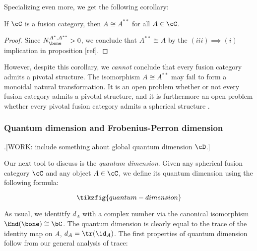 Specializing even more, we get the following corollary:

\begin{cor} If $\cC$ is a fusion category, then $A\cong A^{**}$ for all $A\in \cC$.
\end{cor}
\begin{proof} Since $N^{A^*,A^{**}}_{\bone}>0$, we conclude that $A^{**}\cong A$ by the $(iii)\implies (i)$ implication in proposition [ref].
\end{proof}

However, despite this corollary, we \textit{cannot} conclude that every fusion category admits a pivotal structure. The isomorphism $A\cong A^{**}$ may fail to form a monoidal natural transformation. It is an open problem whether or not every fusion category admits a pivotal structure, and it is furthermore an open problem whether every pivotal fusion category admits a spherical structure \cite{etingof2005fusion}.


\subsubsection{Quantum dimension and Frobenius-Perron dimension}

.[WORK: include something about global quantum dimension $\cD$.]

Our next tool to discuss is the \textit{quantum dimension}. Given any spherical fusion category $\cC$ and any object $A\in \cC$, we define its quantum dimension using the following formula:

\begin{equation*}
\tikzfig{quantum-dimension}
\end{equation*}

As usual, we identitfy $d_A$ with a complex number via the canonical isomorphism $\End(\bone)\cong \bC$. The quantum dimension is clearly equal to the trace of the identity map on $A$, $d_A=\tr(\id_A)$. The first properties of quantum dimension follow from our general analysis of trace:

